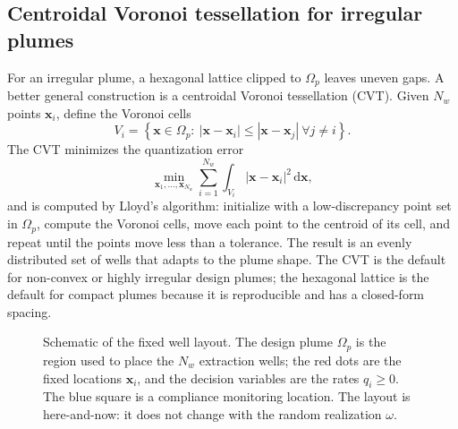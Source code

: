 \documentclass[11pt]{article}
\numberwithin{equation}{section}
\newcommand{\dd}{\,\mathrm{d}}
\newcommand{\abs}[1]{\left\lvert #1 \right\rvert}
\newcommand{\xx}{\mathbf{x}}
\theoremstyle{plain}
\begin{document}
\subsection{Centroidal Voronoi tessellation for irregular plumes}

For an irregular plume, a hexagonal lattice clipped to $\Omega_p$ leaves
uneven gaps.  A better general construction is a centroidal Voronoi
tessellation (CVT).  Given $N_w$ points $\xx_i$, define the Voronoi cells
\begin{equation}
\label{eq:voronoi}
V_i=\left\{\xx\in\Omega_p:\ \abs{\xx-\xx_i}\le\abs{\xx-\xx_j}
\ \forall j\ne i\right\}.
\end{equation}
The CVT minimizes the quantization error
\begin{equation}
\label{eq:cvt}
\min_{\xx_1,\dots,\xx_{N_w}}
\sum_{i=1}^{N_w}\int_{V_i}\abs{\xx-\xx_i}^2\dd\xx,
\end{equation}
and is computed by Lloyd's algorithm: initialize with a low-discrepancy point
set in $\Omega_p$, compute the Voronoi cells, move each point to the centroid
of its cell, and repeat until the points move less than a tolerance.  The
result is an evenly distributed set of wells that adapts to the plume shape.
The CVT is the default for non-convex or highly irregular design plumes; the
hexagonal lattice is the default for compact plumes because it is
reproducible and has a closed-form spacing.

\begin{figure}[htbp]
\centering
{}
\caption{Schematic of the fixed well layout.  The design plume $\Omega_p$ is
the region used to place the $N_w$ extraction wells; the red dots are the
fixed locations $\xx_i$, and the decision variables are the rates $q_i\ge0$.
The blue square is a compliance monitoring location.  The layout is
here-and-now: it does not change with the random realization $\omega$.}
\label{fig:wells}
\end{figure}
\end{document}
